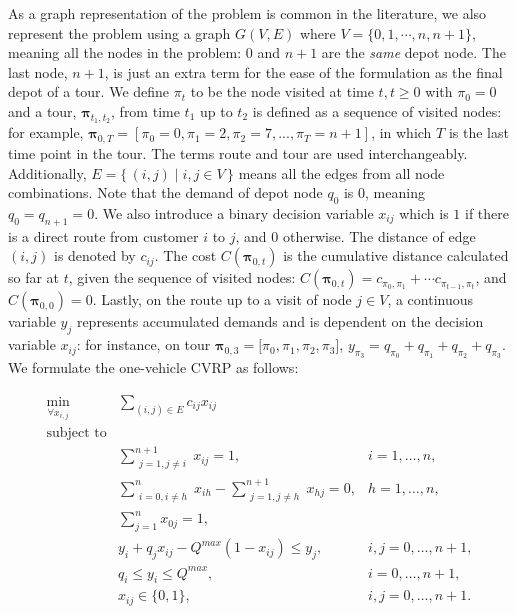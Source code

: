\documentclass{article}
\newcommand\Set[2]{\{\,#1\mid#2\,\}}
\begin{document}
As a graph representation of the problem is common in the literature, we also represent the problem using a graph $G(V, E)$ where $V = \{0, 1, \cdots, n, n+1 \}$, meaning all the nodes in the problem: $0$ and $n+1$ are the \textit{same} depot node. The last node, $n+1$, is just an extra term for the ease of the formulation as the final depot of a tour. We define $\pi_t$ to be the node visited at time $t, t \ge 0$ with $\pi_0 = 0$ and a tour, $\boldsymbol{\pi}_{t_1,t_2}$, from time $t_1$ up to $t_2$ is defined as a sequence of visited nodes: for example, $\boldsymbol{\pi}_{0,T} = [\pi_0=0, \pi_1=2, \pi_2=7, ..., \pi_{T}=n+1]$, in which $T$ is the last time point in the tour. The terms route and tour are used interchangeably. Additionally, $E=\Set{(i,j)}{i, j \in V}$ means all the edges from all node combinations. Note that the demand of depot node $q_0$ is $0$, meaning $q_0=q_{n+1}=0$. We also introduce a binary decision variable $x_{ij}$ which is $1$ if there is a direct route from customer $i$ to $j$, and $0$ otherwise.
The distance of edge $(i,j)$ is denoted by $c_{ij}$.
The cost $C(\boldsymbol{\pi}_{0,t})$ is the cumulative distance calculated so far at $t$, given the sequence of visited nodes: $C(\boldsymbol{\pi}_{0,t}) = c_{\pi_0, \pi_1} + \cdots c_{\pi_{t-1}, \pi_{t}}$, and $C(\boldsymbol{\pi}_{0,0}) = 0$.
Lastly, on the route up to a visit of node $j\in V$, a continuous variable $y_j$ represents accumulated demands and is dependent on the decision variable $x_{ij}$: for instance, on tour $\boldsymbol{\pi}_{0,3}=[\pi_0, \pi_1, \pi_2, \pi_3$], $y_{\pi_3} = q_{\pi_0} + q_{\pi_1} + q_{\pi_2} + q_{\pi_3}$. We formulate the one-vehicle CVRP as follows:


  \begin{align}
    \min_{\forall x_{i,j}} & \sum\limits_{(i, j) \in E} c_{ij}x_{ij}\\
    \nonumber \text{subject to} & \\
    & \sum_{\substack{j=1,j \neq i  }}^{n+1} x_{i j}=1,  & i=1, \ldots, n, \\
    & \sum_{\substack{i=0, i \neq h }}^n x_{i h}-\sum_{\substack{j=1,j \neq h }}^{n+1} x_{h j}=0, & h=1, \ldots, n, \\
    & \sum_{j=1}^n x_{0 j} = 1, & \\
    & y_i+q_j x_{i j}-Q^{max}\left(1-x_{i j}\right) \leq y_j , & i, j=0, \ldots, n+1, \\
    & q_i \leq y_i \leq Q^{max}, & i=0, \ldots, n+1, \\
    & x_{i j} \in\{0,1\}, & i, j=0, \ldots, n+1 .
  \end{align}
\end{document}

